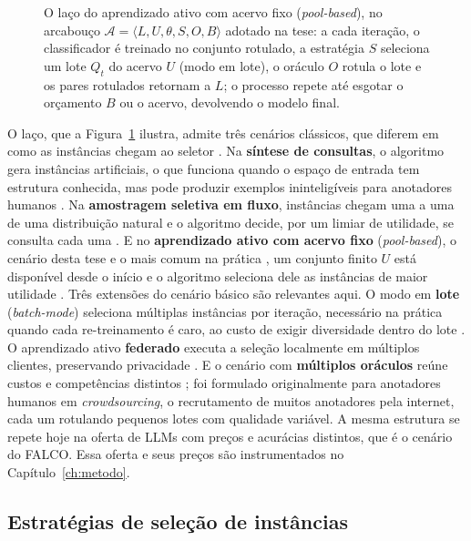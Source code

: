 \begin{figure}[htbp]
    \centering
    
    \caption{O laço do aprendizado ativo com acervo fixo
    (\textit{pool-based}), no arcabouço
    $\mathcal{A}=\langle L, U, \theta, S, O, B\rangle$ adotado na tese: a
    cada iteração, o classificador é treinado no conjunto rotulado, a
    estratégia $S$ seleciona um lote $Q_t$ do acervo $U$ (modo em lote), o
    oráculo $O$ rotula o lote e os pares rotulados retornam a $L$; o
    processo repete até esgotar o orçamento $B$ ou o acervo, devolvendo o
    modelo final.}
    \label{fig:fund-laco-al}
\end{figure}

O laço, que a Figura~\ref{fig:fund-laco-al} ilustra, admite três cenários
clássicos, que diferem em como as instâncias
chegam ao seletor \cite{Settles2012}. Na \textbf{síntese de consultas}, o
algoritmo gera instâncias artificiais, o que funciona quando o espaço de
entrada tem estrutura conhecida, mas pode produzir exemplos ininteligíveis
para anotadores humanos \cite{Baum1992}. Na \textbf{amostragem seletiva em
fluxo}, instâncias chegam uma a uma de uma distribuição natural e o algoritmo
decide, por um limiar de utilidade, se consulta cada uma \cite{Dagan1995}. E
no \textbf{aprendizado ativo com acervo fixo} (\textit{pool-based}), o
cenário desta tese e o mais comum na prática \cite{Settles2012}, um conjunto
finito $U$ está disponível desde o início e o algoritmo seleciona dele as
instâncias de maior utilidade \cite{Lewis1994}. Três extensões do
cenário básico são relevantes aqui. O modo em \textbf{lote}
(\textit{batch-mode}) seleciona múltiplas instâncias por iteração, necessário
na prática quando cada re-treinamento é caro, ao custo de exigir diversidade
dentro do lote \cite{Hoi2006}. O aprendizado ativo \textbf{federado} executa
a seleção localmente em múltiplos clientes, preservando privacidade
\cite{Deng2023fedal}. E o cenário com \textbf{múltiplos oráculos} reúne
custos e competências distintos \cite{Yan2011}; foi formulado originalmente
para anotadores humanos em \textit{crowdsourcing}, o recrutamento de muitos
anotadores pela internet, cada um rotulando pequenos lotes com qualidade
variável. A mesma
estrutura se repete hoje na oferta de LLMs com preços e acurácias distintos,
que é o cenário do FALCO. Essa oferta e
seus preços são instrumentados no Capítulo~\ref{ch:metodo}.

\subsection{Estratégias de seleção de instâncias}
\label{sec:estrategias_selecao}

